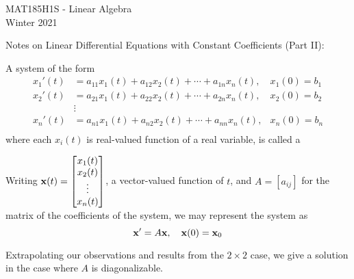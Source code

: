 \documentclass[10pt]{article}
\begin{document}
\begin{center}
    MAT185H1S - Linear Algebra \\ 
    Winter 2021
\end{center}
Notes on Linear Differential Equations with Constant Coefficients (Part II):

\begin{definition}
    A system of the form
    \vspace{2mm}
    \begin{align*}
        x_1'(t) &= a_{11}x_1(t) + a_{12}x_2(t) + \cdots + a_{1n}x_n(t),& x_1(0)=b_1 \\ 
        x_2'(t) &= a_{21}x_1(t) + a_{22}x_2(t) + \cdots + a_{2n}x_n(t),& x_2(0)=b_2 \\ 
        & \vdots & \\ 
        x_n'(t) &= a_{n1}x_1(t) + a_{n2}x_2(t) + \cdots + a_{nn}x_n(t),& x_n(0)=b_n \\
    \end{align*}
    where each $x_i(t)$ is real-valued function of a real variable, is called a 
\end{definition}

Writing $\mathbf{x}(t) = \begin{bmatrix}
    x_1(t) \\ x_2(t) \\ \vdots \\ x_n(t)
\end{bmatrix}$, a vector-valued function of $t$, and $A=[a_{ij}]$ for the matrix of the coefficients of the system, we may represent the system as
\begin{equation*}
    \mathbf{x'}=A\mathbf{x},\quad \mathbf{x}(0)=\mathbf{x}_0
\end{equation*}
\vspace{2mm}

Extrapolating our observations and results from the $2\times 2$ case, we give a solution in the case where $A$ is diagonalizable.
\end{document}
